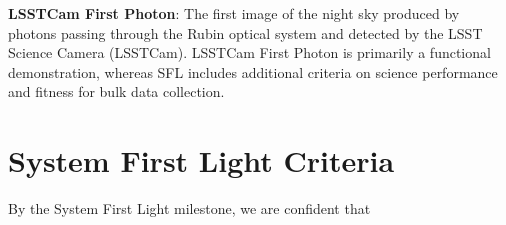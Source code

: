 \documentclass[SE,authoryear,toc,lsstdraft]{lsstdoc}
\begin{document}
\textbf {LSSTCam First Photon}: The first image of the night sky produced by photons passing through the Rubin optical system and detected by the LSST Science Camera (LSSTCam).
LSSTCam First Photon is primarily a functional demonstration, whereas SFL includes additional criteria on science performance and fitness for bulk data collection.

\section{System First Light Criteria}
\label{criteria}

By the System First Light milestone, we are confident that
\end{document}
